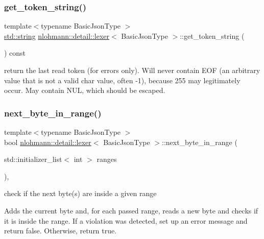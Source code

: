 \subsubsection{\texorpdfstring{get\+\_\+token\+\_\+string()}{get\_token\_string()}}
{\footnotesize\ttfamily template$<$typename Basic\+Json\+Type $>$ \\
\hyperlink{namespacenlohmann_1_1detail_a1ed8fc6239da25abcaf681d30ace4985ab45cffe084dd3d20d928bee85e7b0f21}{std\+::string} \hyperlink{classnlohmann_1_1detail_1_1lexer}{nlohmann\+::detail\+::lexer}$<$ Basic\+Json\+Type $>$\+::get\+\_\+token\+\_\+string (\begin{DoxyParamCaption}{ }\end{DoxyParamCaption}) const\hspace{0.3cm}{\ttfamily [inline]}}

return the last read token (for errors only). Will never contain E\+OF (an arbitrary value that is not a valid char value, often -\/1), because 255 may legitimately occur. May contain N\+UL, which should be escaped. \mbox{\label{classnlohmann_1_1detail_1_1lexer_a2faa544ab5475523ead81f9cdef41a0a}} 
\subsubsection{\texorpdfstring{next\+\_\+byte\+\_\+in\+\_\+range()}{next\_byte\_in\_range()}}
{\footnotesize\ttfamily template$<$typename Basic\+Json\+Type $>$ \\
bool \hyperlink{classnlohmann_1_1detail_1_1lexer}{nlohmann\+::detail\+::lexer}$<$ Basic\+Json\+Type $>$\+::next\+\_\+byte\+\_\+in\+\_\+range (\begin{DoxyParamCaption}\item[{std\+::initializer\+\_\+list$<$ int $>$}]{ranges }\end{DoxyParamCaption})\hspace{0.3cm}{\ttfamily [inline]}, {\ttfamily [private]}}



check if the next byte(s) are inside a given range 

Adds the current byte and, for each passed range, reads a new byte and checks if it is inside the range. If a violation was detected, set up an error message and return false. Otherwise, return true.


